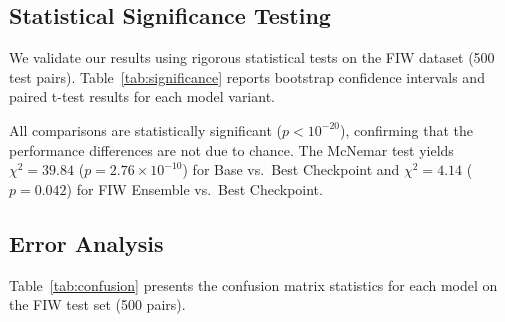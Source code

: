 \documentclass[journal,12pt]{IEEEtran}
\begin{document}
\subsection{Statistical Significance Testing}
\label{sec:stat_tests}

We validate our results using rigorous statistical tests on the FIW
dataset (500 test pairs). Table~\ref{tab:significance} reports bootstrap
confidence intervals and paired t-test results for each model variant.

\begin{table}[t]
    \centering
    \caption{Statistical significance analysis on FIW test set (N=500).
    Bootstrap 95\% CI and paired t-test against best checkpoint baseline.}
    \label{tab:significance}
\end{table}

All comparisons are statistically significant ($p < 10^{-20}$), confirming
that the performance differences are not due to chance. The McNemar test
yields $\chi^2 = 39.84$ ($p = 2.76 \times 10^{-10}$) for Base vs.\ Best
Checkpoint and $\chi^2 = 4.14$ ($p = 0.042$) for FIW Ensemble vs.\ Best
Checkpoint.

\subsection{Error Analysis}
\label{sec:error_analysis}

Table~\ref{tab:confusion} presents the confusion matrix statistics for
each model on the FIW test set (500 pairs).
\end{document}
